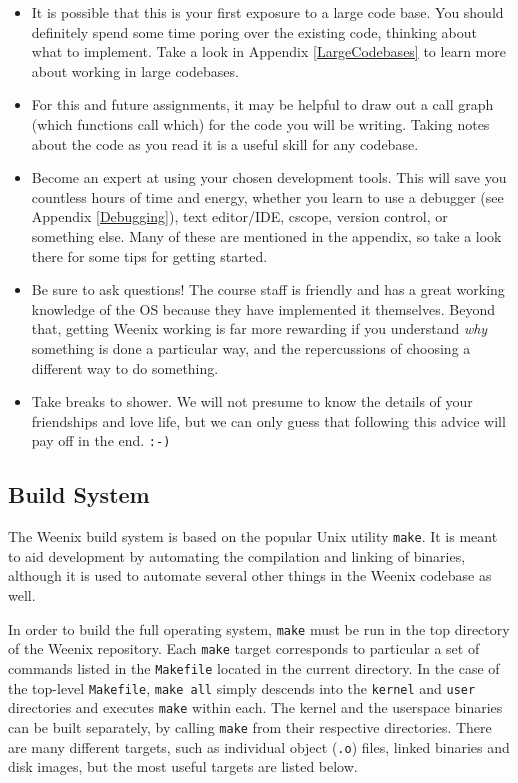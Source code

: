 \begin{itemize}
    \item It is possible that this is your first exposure to a large code base. You should definitely spend some time poring over the existing code, thinking about what to implement. Take a look in Appendix \ref{LargeCodebases} to learn more about working in large codebases.
    \item For this and future assignments, it may be helpful to draw out a call graph (which functions call which) for the code you will be writing. Taking notes about the code as you read it is a useful skill for any codebase.
    \item Become an expert at using your chosen development tools. This will save you countless hours of time and energy, whether you learn to use a debugger (see Appendix \ref{Debugging}), text editor/IDE, cscope, version control, or something else. Many of these are mentioned in the appendix, so take a look there for some tips for getting started.
    \item Be sure to ask questions! The course staff is friendly and has a great working knowledge of the OS because they have implemented it themselves. Beyond that, getting Weenix working is far more rewarding if you understand \emph{why} something is done a particular way, and the repercussions of choosing a different way to do something.
    \item Take breaks to shower. We will not presume to know the details of your friendships and love life, but we can only guess that following this advice will pay off in the end. \texttt{:-)}
\end{itemize}

\subsection{Build System}
The Weenix build system is based on the popular Unix utility \texttt{make}. It is meant to aid development by automating the compilation and linking of binaries, although it is used to automate several other things in the Weenix codebase as well.

In order to build the full operating system, \texttt{make} must be run in the top directory of the Weenix repository. Each \texttt{make} target corresponds to particular a set of commands listed in the \texttt{Makefile} located in the current directory. In the case of the top-level \texttt{Makefile}, \texttt{make all} simply descends into the \texttt{kernel} and \texttt{user} directories and executes \texttt{make} within each. The kernel and the userspace binaries can be built separately, by calling \texttt{make} from their respective directories. There are many different targets, such as individual object (\texttt{.o}) files, linked binaries and disk images, but the most useful targets are listed below.
  
